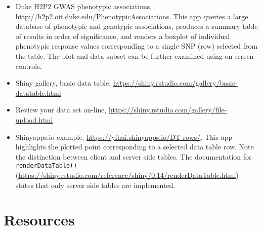 \documentclass[10pt, letterpaper]{article}
\begin{document}
\begin{spacing}{1.0}
\begin{itemize}
    \item Duke H2P2 GWAS phenotypic associations, \url{http://h2p2.oit.duke.edu/PhenotypicAssociations}.  This app queries a large database of phenotypic and genotypic associations, produces a summary table of results in order of significance, and renders a boxplot of individual phenotypic response values corresponding to a single SNP (row) selected from the table.  The plot and data subset can be further examined using on screen controls.
    
    \item Shiny gallery, basic data table, \url{https://shiny.rstudio.com/gallery/basic-datatable.html}
    
    \item Review your data set on-line, \url{https://shiny.rstudio.com/gallery/file-upload.html}
    
    \item Shinyapps.io example, \url{https://yihui.shinyapps.io/DT-rows/}.  This app highlights the plotted point corresponding to a selected data table row.  Note the distinction between client and server side tables.  The documentation for \texttt{renderDataTable()} (\url{https://shiny.rstudio.com/reference/shiny/0.14/renderDataTable.html}) states that only server side tables are implemented.
    
\end{itemize}


\section{Resources}\label{sec:resources}

\begin{itemize}


\end{itemize}
\end{spacing}
\end{document}

